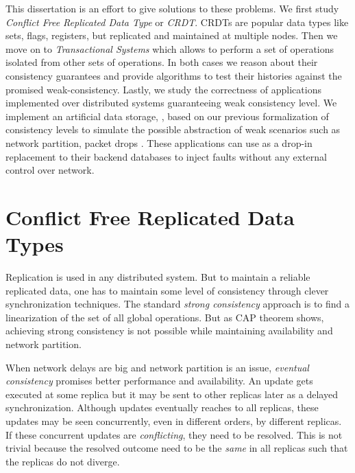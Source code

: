 This dissertation is an effort to give solutions to these problems. We first study \emph{Conflict Free Replicated Data Type} or \emph{CRDT}. CRDTs are popular data types like sets, flags, registers, but replicated and maintained at multiple nodes. Then we move on to \emph{Transactional Systems} which allows to perform a set of operations isolated from other sets of operations. In both cases we reason about their consistency guarantees and provide algorithms to test their histories against the promised weak-consistency. Lastly, we study the correctness of applications implemented over distributed systems guaranteeing weak consistency level. We implement an artificial data storage, \tool{}, based on our previous formalization of consistency levels to simulate the possible abstraction of weak scenarios such as network partition, packet drops \etc{}. These applications can use \tool{} as a drop-in replacement to their backend databases to inject faults without any external control over network.


\section{Conflict Free Replicated Data Types}

Replication is used in any distributed system. But to maintain a reliable replicated data, one has to maintain some level of consistency through clever synchronization techniques. The standard \emph{strong consistency} approach is to find a linearization of the set of all global operations. But as CAP theorem shows, achieving strong consistency is not possible while maintaining availability and network partition.

When network delays are big and network partition is an issue, \emph{eventual consistency} promises better performance and availability. An update gets executed at some replica but it may be sent to other replicas later as a delayed synchronization. Although updates eventually reaches to all replicas, these updates may be seen concurrently, even in different orders, by different replicas. If these concurrent updates are \emph{conflicting}, they need to be resolved. This is not trivial because the resolved outcome need to be the \emph{same} in all replicas such that the replicas do not diverge.

